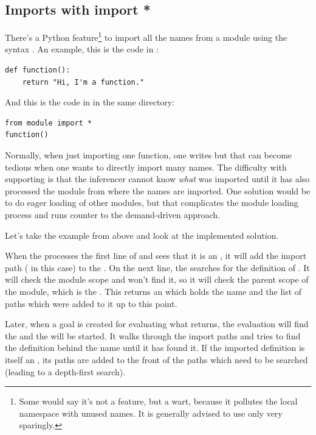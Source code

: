 \documentclass[12pt,halfparskip]{scrreprt}
\begin{document}

\subsection{Imports with import *}\label{import_star}


There's a Python feature\footnote{Some would say it's not a feature, but a wart, because it pollutes the local namespace with unused names. It is generally advised to use  only very sparingly.} to import all the names from a module using the syntax . An example, this is the code in :

\begin{lstlisting}
def function():
    return "Hi, I'm a function."
\end{lstlisting}

And this is the code in  in the same directory:

\begin{lstlisting}
from module import *
function()
\end{lstlisting}

Normally, when just importing one function, one writes  but that can become tedious when one wants to directly import many names. The difficulty with supporting  is that the inferencer cannot know \emph{what} was imported until it has also processed the module from where the names are imported. One solution would be to do eager loading of other modules, but that complicates the module loading process and runs counter to the demand-driven approach.

Let's take the example from above and look at the implemented solution.

When the  processes the first line of  and sees that it is an , it will add the import path ( in this case) to the . On the next line, the  searches for the definition of . It will check the module scope and won't find it, so it will check the parent scope of the module, which is the . This returns an  which holds the name and the list of  paths which were added to it up to this point.

Later, when a goal is created for evaluating what  returns, the evaluation will find the   and the  will be started. It walks through the import paths and tries to find the definition behind the name  until it has found it. If the imported definition is itself an , its paths are added to the front of the paths which need to be searched (leading to a depth-first search).
\end{document}
